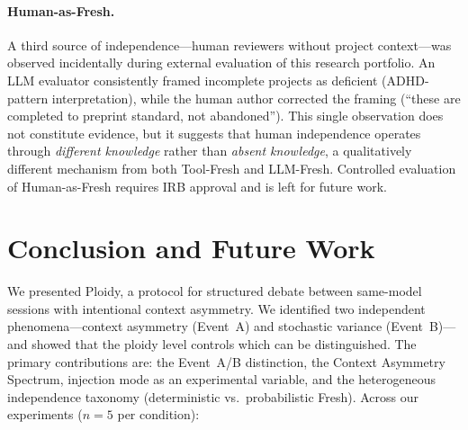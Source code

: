 \documentclass[11pt]{article}
\begin{document}
\paragraph{Human-as-Fresh.}
A third source of independence---human reviewers without project context---was observed incidentally during external evaluation of this research portfolio. An LLM evaluator consistently framed incomplete projects as deficient (ADHD-pattern interpretation), while the human author corrected the framing (``these are completed to preprint standard, not abandoned''). This single observation does not constitute evidence, but it suggests that human independence operates through \emph{different knowledge} rather than \emph{absent knowledge}, a qualitatively different mechanism from both Tool-Fresh and LLM-Fresh. Controlled evaluation of Human-as-Fresh requires IRB approval and is left for future work.

\section{Conclusion and Future Work}
\label{sec:conclusion}

We presented Ploidy, a protocol for structured debate between same-model sessions with intentional context asymmetry. We identified two independent phenomena---context asymmetry (Event~A) and stochastic variance (Event~B)---and showed that the ploidy level controls which can be distinguished. The primary contributions are: the Event~A/B distinction, the Context Asymmetry Spectrum, injection mode as an experimental variable, and the heterogeneous independence taxonomy (deterministic vs.\ probabilistic Fresh). Across our experiments ($n{=}5$ per condition):
\end{document}
